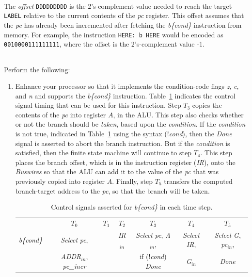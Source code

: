 \documentclass[epsfig,10pt,fullpage]{article} \addtolength{\textwidth}{1.5in}
\begin{document}
~\\
\noindent
The {\it offset} \texttt{DDDDDDDDD} is the 2's-complement value
needed to reach the target \texttt{LABEL} relative to the current contents of the {\it pc}
register.  This offset assumes that the {\it pc} has already been incremented after fetching the 
{\it b\{cond\}} instruction from memory. For example, the instruction \texttt{HERE: b HERE} 
would be encoded as \texttt{0010000111111111}, where the offset is the 2's-complement value -1.

~\\
\noindent
Perform the following:

\begin{enumerate}
\item 
Enhance your processor so that it implements the condition-code flags {\it z}, {\it c}, and
{\it n} and supports the {\it b\{cond\}} instruction. Table~\ref{tab:control_b} indicates the 
control signal timing that can be used for this instruction. Step $T_3$ copies the
contents of the {\it pc} into register $A$, in the ALU. This step also checks whether or 
not the branch should be {\it taken}, based upon the {\it condition}. If the 
{\it condition} is not true, indicated in Table~\ref{tab:control_b} using the syntax 
(!{\it cond}), then the {\it Done} signal is asserted to abort the branch instruction. But if
the {\it condition} is satisfied, then the finite state machine will continue to step $T_4$.
This step places the branch offset, which is in the instruction register ({\it IR}), 
onto the {\it Buswires} so that the ALU can add it to the value of the {\it pc} that was
previously copied into register $A$. Finally, step $T_5$ transfers the computed branch-target 
address to the {\it pc}, so that the branch will be taken. 

\begin{table}[H]
\begin{center}
\begin{tabular}{r|c|c|c|c|c|c|}
\multicolumn{1}{c}{~} & \multicolumn{1}{c}{$T_0$} & \multicolumn{1}{c}{$T_1$} & \multicolumn{1}{c}{$T_2$} & \multicolumn{1}{c}{$T_3$} & \multicolumn{1}{c}{$T_4$} & \multicolumn{1}{c}{$T_5$} \rule[-0.075in]{0in}{0.25in}\\ \cline{2-7}
{\it b\{cond\}~} & {\it Select} {\it pc}, & ~ & {\it IR}$_{in}$ &
\rule[-0.075in]{0in}{0.25in}{\it Select} {\it pc}, {\it A}$_{in}$, & {\it Select} {\it
IR},
& {\it Select} {\it G}, {\it pc}$_{in}$, \\
~ & {\it ADDR}$_{in}$, {\it pc\_incr} & ~ & ~ & if (!{\it cond}) {\it Done} & {\it G}$_{in}$ & {\it Done} \\ \cline{2-7}
\cline{2-7}
\end{tabular}
\caption{Control signals asserted for {\it b\{cond\}} in each time step.}
\label{tab:control_b}
\end{center}
\end{table}


\end{enumerate}
\end{document}

